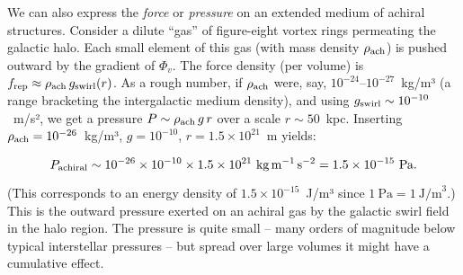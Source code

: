 We can also express the \textit{force} or \textit{pressure} on an extended medium of achiral structures. Consider a dilute “gas” of figure-eight vortex rings permeating the galactic halo. Each small element of this gas (with mass density $\rho_{\rm ach}$) is pushed outward by the gradient of $\Phi_v$. The force density (per volume) is $f_{\rm rep} \approx \rho_{\rm ach} \, g_{\rm swirl}(r)$. As a rough number, if $\rho_{\rm ach}$ were, say, $10^{-24}$–$10^{-27}$~kg/m³ (a range bracketing the intergalactic medium density), and using $g_{\rm swirl}\sim10^{-10}$~m/s², we get a pressure $P \sim \rho_{\rm ach} \, g \, r$ over a scale $r\sim50$~kpc. Inserting $\rho_{\rm ach}=10^{-26}$~kg/m³, $g=10^{-10}$, $r=1.5\times10^{21}$~m yields:

\[
P_{\rm achiral} \sim 10^{-26}\times10^{-10}\times1.5\times10^{21}~\text{kg}\,\text{m}^{-1}\,\text{s}^{-2} = 1.5\times10^{-15}~\text{Pa}.
\]

(This corresponds to an energy density of $1.5\times10^{-15}$~J/m³ since $1~\text{Pa}=1~\text{J/m}^3$.) This is the outward pressure exerted on an achiral gas by the galactic swirl field in the halo region. The pressure is quite small – many orders of magnitude below typical interstellar pressures – but spread over large volumes it might have a cumulative effect.
